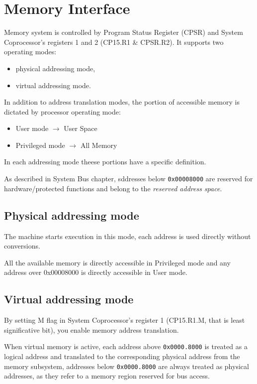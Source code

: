 \chapter{Memory Interface}
Memory system is controlled by Program Status Register (CPSR) and System Coprocessor's registers 1 and 2 (CP15.R1 \& CPSR.R2). It supports two operating modes:

\begin{itemize}
\item physical addressing mode, 
\item virtual addressing mode.
\end{itemize}

In addition to address translation modes, the portion of accessible memory is dictated by processor operating mode:

\begin{itemize}
\item User mode $\rightarrow$ User Space
\item Privileged mode $\rightarrow$ All Memory
\end{itemize}

In each addressing mode theese portions have a specific definition.

As described in System Bus chapter, sddresses below \texttt{0x00008000} are reserved for hardware/protected functions and belong to the \emph{reserved address space}.

\section{Physical addressing mode}
The machine starts execution in this mode, each address is used directly without conversions.

All the available memory is directly accessible in Privileged mode and any address over 0x00008000 is directly accessible in User mode.

\vspace{10px}



\section{Virtual addressing mode}
By setting M flag in System Coprocessor's register 1 (CP15.R1.M, that is least significative bit), you enable memory address translation.

When virtual memory is active, each address above \texttt{0x0000.8000} is treated as a logical address and translated to the corresponding physical address from the memory subsystem, addresses below \texttt{0x0000.8000} are always treated as physical addresses, as they refer to a memory region reserved for bus access.

